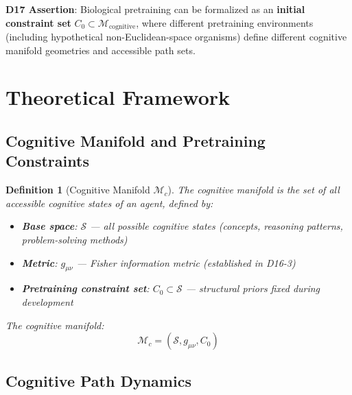 \documentclass[12pt, a4paper]{article}
\newtheorem{definition}{Definition}[section]
\begin{document}
\textbf{D17 Assertion}: Biological pretraining can be formalized as an \textbf{initial constraint set} $C_0 \subset \mathcal{M}_{\mathrm{cognitive}}$, where different pretraining environments (including hypothetical non-Euclidean-space organisms) define different cognitive manifold geometries and accessible path sets.

\begin{center}
\end{center}

\section{Theoretical Framework}

\subsection{Cognitive Manifold and Pretraining Constraints}

\begin{definition}[Cognitive Manifold $\mathcal{M}_c$]\label{def:D17-1}
The cognitive manifold is the set of all accessible cognitive states of an agent, defined by:
\begin{itemize}
    \item \textbf{Base space}: $\mathcal{S}$ --- all possible cognitive states (concepts, reasoning patterns, problem-solving methods)
    \item \textbf{Metric}: $g_{\mu\nu}$ --- Fisher information metric (established in D16-3)
    \item \textbf{Pretraining constraint set}: $C_0 \subset \mathcal{S}$ --- structural priors fixed during development
\end{itemize}

The cognitive manifold:
\[
\mathcal{M}_c = (\mathcal{S}, g_{\mu\nu}, C_0)
\]
\end{definition}

\subsection{Cognitive Path Dynamics}
\end{document}
